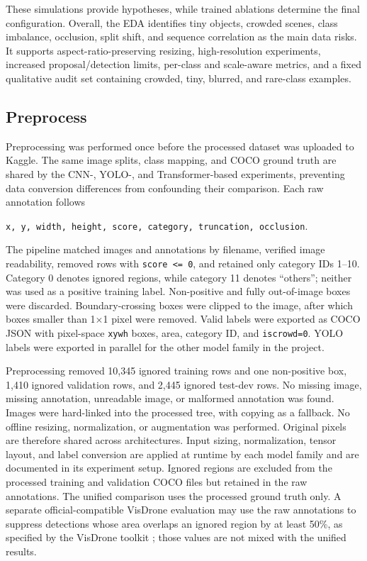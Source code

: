 These simulations provide hypotheses, while trained ablations determine the
final configuration. Overall, the EDA identifies tiny objects, crowded scenes,
class imbalance, occlusion, split shift, and sequence correlation as the main
data risks. It supports aspect-ratio-preserving resizing, high-resolution
experiments, increased proposal/detection limits, per-class and scale-aware
metrics, and a fixed qualitative audit set containing crowded, tiny, blurred,
and rare-class examples.

\subsection{Preprocess}
\label{subsec:preprocess}

Preprocessing was performed once before the processed dataset was uploaded to
Kaggle. The same image splits, class mapping, and COCO ground truth are shared
by the CNN-, YOLO-, and Transformer-based experiments, preventing data
conversion differences from confounding their comparison. Each raw
annotation follows

\begin{center}
\texttt{x, y, width, height, score, category, truncation, occlusion}.
\end{center}

The pipeline matched images and annotations by filename, verified image
readability, removed rows with \texttt{score <= 0}, and retained only category
IDs 1--10. Category 0 denotes ignored regions, while category 11 denotes
``others''; neither was used as a positive training label. Non-positive and
fully out-of-image boxes were discarded. Boundary-crossing boxes were clipped
to the image, after which boxes smaller than 1$\times$1 pixel were removed.
Valid labels were exported as COCO JSON with pixel-space \texttt{xywh} boxes,
area, category ID, and \texttt{iscrowd=0}. YOLO labels were exported in parallel
for the other model family in the project.

Preprocessing removed 10,345 ignored training rows and one non-positive box,
1,410 ignored validation rows, and 2,445 ignored test-dev rows. No missing
image, missing annotation, unreadable image, or malformed annotation was found.
Images were hard-linked into the processed tree, with copying as a fallback.
No offline resizing, normalization, or augmentation was performed. Original
pixels are therefore shared across architectures. Input sizing, normalization,
tensor layout, and label conversion are applied at runtime by each model family
and are documented in its experiment setup. Ignored regions are excluded from the processed
training and validation COCO files but retained in the raw annotations. The
unified comparison uses the processed ground truth only. A separate
official-compatible VisDrone evaluation may use the raw annotations to suppress
detections whose area overlaps an ignored region by at least 50\%, as specified
by the VisDrone toolkit \cite{visdrone_toolkit}; those values are not mixed with
the unified results.

